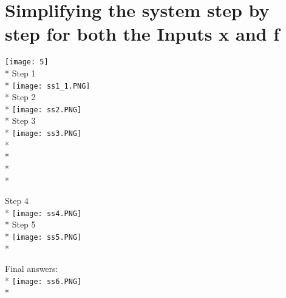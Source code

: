 \documentclass{article}
\begin{document}
\section{Simplifying the system step by step for both the Inputs x and f}
\texttt{[image: 5]}\\*
Step 1\\*
\texttt{[image: ss1\_1.PNG]} \\*
Step 2\\*
\texttt{[image: ss2.PNG]} \\*
Step 3\\*
\texttt{[image: ss3.PNG]}\\*\\*\\*\\*


Step 4\\*
\texttt{[image: ss4.PNG]}\\*
Step 5\\*
\texttt{[image: ss5.PNG]}\\*

Final answers:\\*
\texttt{[image: ss6.PNG]}\\*
\end{document}
